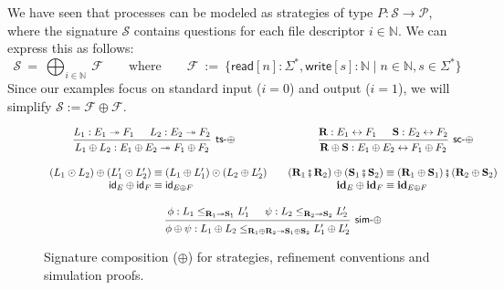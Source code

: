 \documentclass[acmsmall,screen,review,anonymous,nonacm]{acmart}
\newcommand{\kw}[1]{\ensuremath{ \mathsf{#1} }}
\newcommand{\idsc}{\mathbf{id}} %
\newcommand{\vcomp}{\fatsemi}
\begin{document}
\begin{example}
We have seen that processes can be modeled as
strategies of type $P : \mathcal{S} \rightarrow \mathcal{P}$,
where the signature $\mathcal{S}$ contains questions for
each file descriptor $i \in \mathbb{N}$.
We can express this as follows:
\[
  \mathcal{S} \: = \: \bigoplus_{i \in \mathbb{N}} \: \mathcal{F}
  \qquad \text{where} \qquad
  \mathcal{F} \: := \:
    \{ \kw{read}[n] : \Sigma^*, \kw{write}[s] : \mathbb{N} \mid n \in \mathbb{N}, s \in \Sigma^* \}
\]
Since our examples focus on standard input ($i=0$) and output ($i=1$),
we will simplify $\mathcal{S} := \mathcal{F} \oplus \mathcal{F}$.
\end{example}

\begin{figure} %
  \begin{gather*}
    \begin{prooftree}
      \hypo{L_1 : E_1 \twoheadrightarrow F_1}
      \hypo{L_2 : E_2 \twoheadrightarrow F_2}
      \infer2[\kw{ts}-$\oplus$]{
        L_1 \oplus L_2 : E_1 \oplus E_2 \twoheadrightarrow F_1 \oplus F_2}
    \end{prooftree}
    \hspace{8em}
    \begin{prooftree}
      \hypo{\mathbf{R} : E_1 \leftrightarrow F_1}
      \hypo{\mathbf{S} : E_2 \leftrightarrow F_2}
      \infer2[\kw{sc}-$\oplus$]{
        \mathbf{R} \oplus \mathbf{S} : E_1 \oplus E_2 \leftrightarrow F_1 \oplus F_2
      }
    \end{prooftree}
    \\[1em]
    \begin{array}{r@{}l}
      (L_1 \odot L_2) \oplus (L_1' \odot L_2') & {} \equiv
      (L_1 \oplus L_1') \odot (L_2 \oplus L_2') \\
      \kw{id}_E \oplus \kw{id}_F & {} \equiv \kw{id}_{E \oplus F}
    \end{array}
    \quad
    \begin{array}{r@{}l}
      (\mathbf{R}_1 \vcomp \mathbf{R}_2) \oplus (\mathbf{S}_1 \vcomp \mathbf{S}_2)
      & {} \equiv
      (\mathbf{R}_1 \oplus \mathbf{S}_1) \vcomp (\mathbf{R}_2 \oplus \mathbf{S}_2)
      \\
      \idsc_E \oplus \idsc_F & {} \equiv \idsc_{E \oplus F}
    \end{array}
    \\[1em]
    \begin{prooftree}
      \hypo{\phi: L_1 \le_{\mathbf{R}_1 \twoheadrightarrow \mathbf{S}_1} L_1'}
      \hypo{\psi: L_2 \le_{\mathbf{R}_2 \twoheadrightarrow \mathbf{S}_2} L_2'}
      \infer2[\kw{sim}-$\oplus$]{\phi \oplus \psi :
	L_1 \oplus L_2
        \le_{\mathbf{R}_1 \oplus \mathbf{R}_2 \twoheadrightarrow
             \mathbf{S}_1 \oplus \mathbf{S}_2}
	L_1' \oplus L_2'}
    \end{prooftree}
  \end{gather*}
  \caption{Signature composition ($\oplus$) for strategies,
    refinement conventions and simulation proofs.}
  \label{fig:fcomp}
\end{figure}
\end{document}

